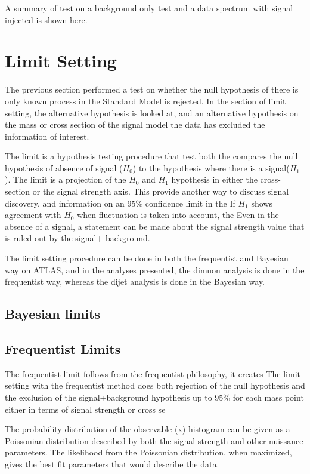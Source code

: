     A summary of test on a background only test and a data spectrum with signal injected is shown here.

    
\section{Limit Setting}

The previous section performed a test on whether the null hypothesis of there is only known process in the Standard Model is rejected. In the section of limit setting, the alternative hypothesis is looked at, and an alternative hypothesis on the mass or cross section of the signal model the data has excluded the information of interest. 

The limit is a hypothesis testing procedure that test both the compares the null hypothesis of absence of signal ($H_{0}$) to the hypothesis where there is a signal($H_{1}$). 
The limit is a projection of the $H_0$ and $H_1$ hypothesis in either the cross-section or the signal strength axis. This provide another way to discuss signal discovery, and information on an 95\% confidence limit in the If $H_1$ shows agreement with $H_{0}$ when fluctuation is taken into account, the 
Even in the absence of a signal, a statement can be made about the signal strength value that is ruled out by the signal+ background. 

The limit setting procedure can be done in both the frequentist and Bayesian way on ATLAS, and in the analyses presented, the dimuon analysis is done in the frequentist way, whereas the dijet analysis is done in the Bayesian way. 

\subsection{Bayesian limits}

\subsection{Frequentist Limits}
The frequentist limit follows from the frequentist philosophy, it creates 
The limit setting with the frequentist method does both rejection of the null hypothesis and the exclusion of the signal+background hypothesis up to 95\% for each mass point either in terms of signal strength or cross se

The probability distribution of the observable (x) histogram can be given as a Poissonian distribution described by both the signal strength and other nuissance parameters. The likelihood from the Poissonian distribution, when maximized, gives the best fit parameters that would describe the data. 

